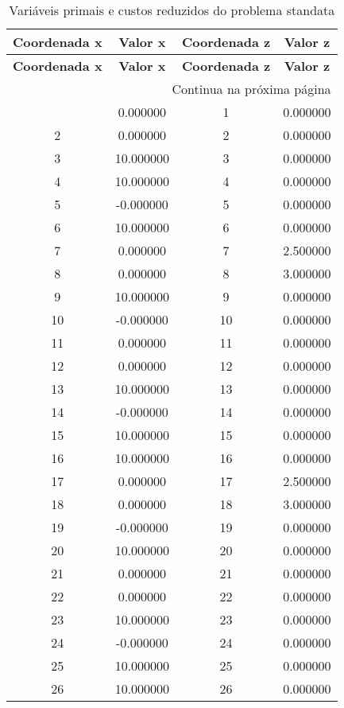 \documentclass[12pt]{article}
\begin{document}
\begin{longtable}{@{}cccc@{}}
\caption{Variáveis primais e custos reduzidos do problema standata} \\
\toprule
\textbf{Coordenada x} & \textbf{Valor x} & \textbf{Coordenada z} & \textbf{Valor z} \\
\midrule
\endfirsthead

\toprule
\textbf{Coordenada x} & \textbf{Valor x} & \textbf{Coordenada z} & \textbf{Valor z} \\
\midrule
\endhead

\midrule \multicolumn{4}{r}{{Continua na próxima página}} \\ \midrule
\endfoot

\bottomrule
\endlastfoot
1 & 0.000000 & 1 & 0.000000 \\
2 & 0.000000 & 2 & 0.000000 \\
3 & 10.000000 & 3 & 0.000000 \\
4 & 10.000000 & 4 & 0.000000 \\
5 & -0.000000 & 5 & 0.000000 \\
6 & 10.000000 & 6 & 0.000000 \\
7 & 0.000000 & 7 & 2.500000 \\
8 & 0.000000 & 8 & 3.000000 \\
9 & 10.000000 & 9 & 0.000000 \\
10 & -0.000000 & 10 & 0.000000 \\
11 & 0.000000 & 11 & 0.000000 \\
12 & 0.000000 & 12 & 0.000000 \\
13 & 10.000000 & 13 & 0.000000 \\
14 & -0.000000 & 14 & 0.000000 \\
15 & 10.000000 & 15 & 0.000000 \\
16 & 10.000000 & 16 & 0.000000 \\
17 & 0.000000 & 17 & 2.500000 \\
18 & 0.000000 & 18 & 3.000000 \\
19 & -0.000000 & 19 & 0.000000 \\
20 & 10.000000 & 20 & 0.000000 \\
21 & 0.000000 & 21 & 0.000000 \\
22 & 0.000000 & 22 & 0.000000 \\
23 & 10.000000 & 23 & 0.000000 \\
24 & -0.000000 & 24 & 0.000000 \\
25 & 10.000000 & 25 & 0.000000 \\
26 & 10.000000 & 26 & 0.000000 \\

\end{longtable}
\end{document}
